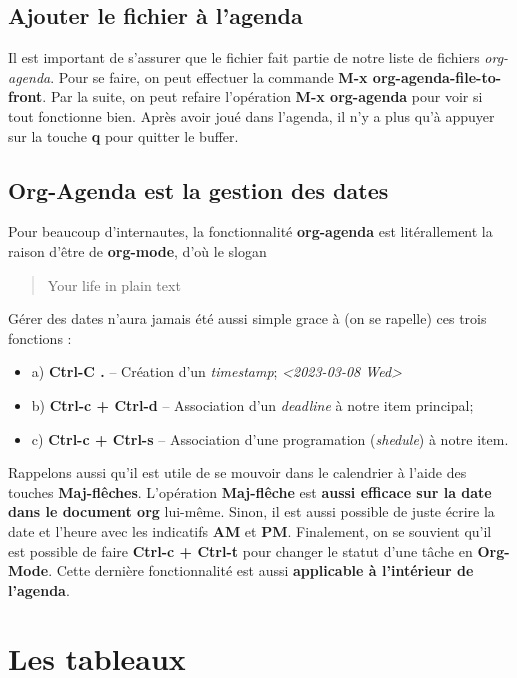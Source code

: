 \documentclass{article}
\numberwithin{equation}{section}
\begin{document}
\subsection{Ajouter le fichier à l'agenda}
\label{sec:org1e7f291}
Il est important de s'assurer que le fichier fait partie de notre liste de fichiers \emph{org-agenda}. 
Pour se faire, on peut effectuer la commande \textbf{M-x org-agenda-file-to-front}.
Par la suite, on peut refaire l'opération \textbf{M-x org-agenda} pour voir si tout fonctionne bien.
Après avoir joué dans l'agenda, il n'y a plus qu'à appuyer sur la touche \textbf{q} pour quitter le buffer.

\subsection{Org-Agenda est la gestion des dates}
\label{sec:org4e251d0}
Pour beaucoup d'internautes, la fonctionnalité \textbf{org-agenda} est litérallement la raison d'être de \textbf{org-mode}, d'où le slogan
\begin{quote}
Your life in plain text
\end{quote}

Gérer des dates n'aura jamais été aussi simple grace à (on se rapelle) ces trois fonctions : 
\begin{itemize}
\item a) \textbf{Ctrl-C .} -- Création d'un \emph{timestamp}; \textit{<2023-03-08 Wed>}
\item b) \textbf{Ctrl-c + Ctrl-d} -- Association d'un \emph{deadline} à notre item principal;
\item c) \textbf{Ctrl-c + Ctrl-s} -- Association d'une programation (\emph{shedule}) à notre item.
\end{itemize}

Rappelons aussi qu'il est utile de se mouvoir dans le calendrier à l'aide des touches \textbf{Maj-flêches}.
L'opération \textbf{Maj-flêche} est \textbf{aussi efficace sur la date dans le document org} lui-même.
Sinon, il est aussi possible de juste écrire la date et l'heure avec les indicatifs \textbf{AM} et \textbf{PM}.
Finalement, on se souvient qu'il est possible de faire \textbf{Ctrl-c + Ctrl-t} pour changer le statut d'une tâche en \textbf{Org-Mode}.
Cette dernière fonctionnalité est aussi \textbf{applicable à l'intérieur de l'agenda}. 

\section{Les tableaux}
\label{sec:org7a60501}
\end{document}
